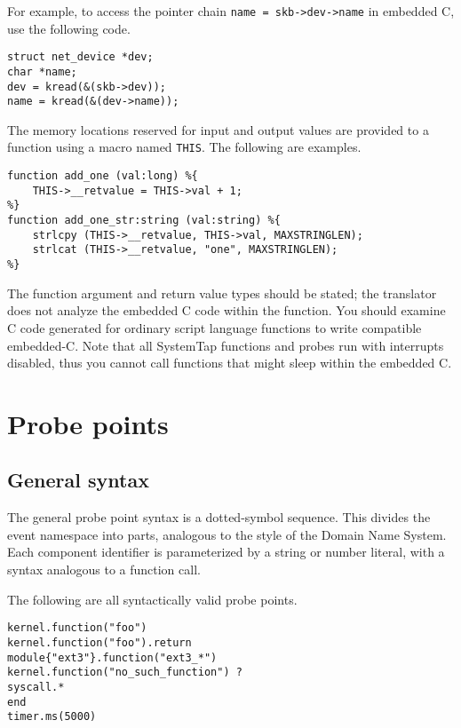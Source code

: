 \documentclass[twoside,english]{article}
\newenvironment{vindent}
{\begin{list}{}{\setlength{\listparindent}{6pt}}
\item[]}
{\end{list}}
\begin{document}
For example, to access the pointer chain \texttt{name = skb->dev->name} in
embedded C, use the following code.

\begin{vindent}
\begin{verbatim}
struct net_device *dev;
char *name;
dev = kread(&(skb->dev));
name = kread(&(dev->name));
\end{verbatim}
\end{vindent}

The memory locations reserved for input and output values are provided to
a function using a macro named \texttt{THIS}. The following
are examples.

\begin{vindent}
\begin{verbatim}
function add_one (val:long) %{
    THIS->__retvalue = THIS->val + 1;
%}
function add_one_str:string (val:string) %{
    strlcpy (THIS->__retvalue, THIS->val, MAXSTRINGLEN);
    strlcat (THIS->__retvalue, "one", MAXSTRINGLEN);
%}
\end{verbatim}
\end{vindent}

The function argument and return value types should be stated;
the translator does not analyze the embedded C code within the function.
You should examine
C code generated for ordinary script language functions to write compatible
embedded-C. Note that all SystemTap functions and probes run with interrupts
disabled, thus you cannot call functions that might sleep within the embedded
C.

\section{Probe points\label{sec:Probe-Points}}
\subsection{General syntax}
The general probe point syntax is a dotted-symbol sequence. This divides
the event namespace into parts, analogous to the style of the Domain Name
System. Each component identifier is parameterized by a string or number
literal, with a syntax analogous to a function call.

The following are all syntactically valid probe points.

\begin{vindent}
\begin{verbatim}
kernel.function("foo")
kernel.function("foo").return
module{"ext3"}.function("ext3_*")
kernel.function("no_such_function") ?
syscall.*
end
timer.ms(5000)
\end{verbatim}
\end{vindent}
\end{document}
